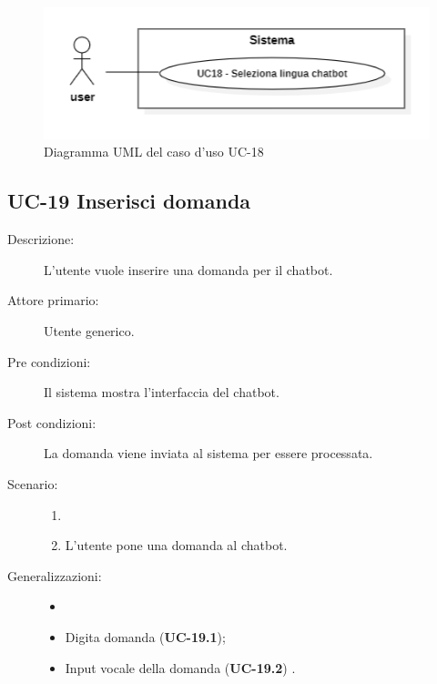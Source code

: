 \begin{figure}[H]
    \centering
    \includegraphics[width=0.8\linewidth]{UC18.PNG}
    \caption{Diagramma UML del caso d'uso UC-18}
\end{figure}

\subsection{UC-19 Inserisci domanda}
\begin{description}
    \item[Descrizione:] L'utente vuole inserire una domanda per il chatbot.
    \item[Attore primario:] Utente generico.
    \item[Pre condizioni:] Il sistema mostra l'interfaccia del chatbot.
    \item[Post condizioni:] La domanda viene inviata al sistema per essere processata.
    \item[Scenario:]
    \begin{enumerate}
        \item[]
        \item L’utente pone una domanda al chatbot.
    \end{enumerate}
    \item[Generalizzazioni:] 
    \begin{itemize}
        \item[] 
        \item Digita domanda (\textbf{UC-19.1});
        \item Input vocale della domanda (\textbf{UC-19.2}) .
    \end{itemize}
\end{description}


